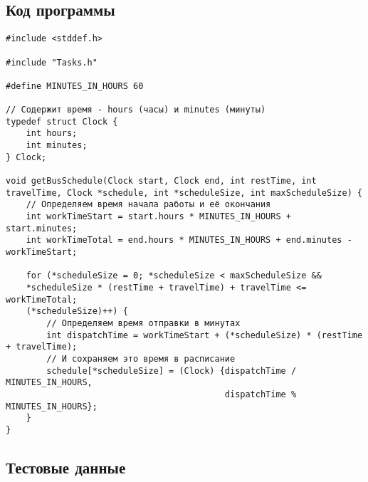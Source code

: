 \documentclass[a4paper, 12pt, oneside]{article}
\begin{document}
    \subsection{Код программы}
    \begin{verbatim}
#include <stddef.h>

#include "Tasks.h"

#define MINUTES_IN_HOURS 60

// Содержит время - hours (часы) и minutes (минуты)
typedef struct Clock {
    int hours;
    int minutes;
} Clock;

void getBusSchedule(Clock start, Clock end, int restTime, int travelTime, Clock *schedule, int *scheduleSize, int maxScheduleSize) {
    // Определяем время начала работы и её окончания
    int workTimeStart = start.hours * MINUTES_IN_HOURS + start.minutes;
    int workTimeTotal = end.hours * MINUTES_IN_HOURS + end.minutes - workTimeStart;

    for (*scheduleSize = 0; *scheduleSize < maxScheduleSize &&
    *scheduleSize * (restTime + travelTime) + travelTime <= workTimeTotal;
    (*scheduleSize)++) {
        // Определяем время отправки в минутах
        int dispatchTime = workTimeStart + (*scheduleSize) * (restTime + travelTime);
        // И сохраняем это время в расписание
        schedule[*scheduleSize] = (Clock) {dispatchTime / MINUTES_IN_HOURS,
                                           dispatchTime % MINUTES_IN_HOURS};
    }
}
    \end{verbatim}

    \subsection{Тестовые данные}
\end{document}
